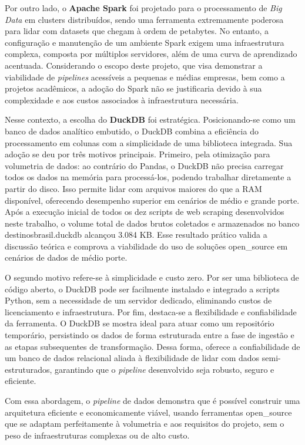 Por outro lado, o \textbf{Apache Spark} foi projetado para o processamento de \textit{Big Data} em clusters distribuídos, sendo uma ferramenta extremamente poderosa para lidar com datasets que chegam à ordem de petabytes. No entanto, a configuração e manutenção de um ambiente Spark exigem uma infraestrutura complexa, composta por múltiplos servidores, além de uma curva de aprendizado acentuada. Considerando o escopo deste projeto, que visa demonstrar a viabilidade de \textit{pipelines} acessíveis a pequenas e médias empresas, bem como a projetos acadêmicos, a adoção do Spark não se justificaria devido à sua complexidade e aos custos associados à infraestrutura necessária.

Nesse contexto, a escolha do \textbf{DuckDB} foi estratégica. Posicionando-se como um banco de dados analítico embutido, o DuckDB combina a eficiência do processamento em colunas com a simplicidade de uma biblioteca integrada. Sua adoção se deu por três motivos principais. Primeiro, pela otimização para volumetria de dados: ao contrário do Pandas, o DuckDB não precisa carregar todos os dados na memória para processá-los, podendo trabalhar diretamente a partir do disco. Isso permite lidar com arquivos maiores do que a RAM disponível, oferecendo desempenho superior em cenários de médio e grande porte. Após a execução inicial de todos os dez scripts de web scraping desenvolvidos neste trabalho, o volume total de dados brutos coletados e armazenados no banco destinosbrasil.duckdb alcançou 3.084 KB. Esse resultado prático valida a discussão teórica e comprova a viabilidade do uso de soluções \acs{open_source} em cenários de dados de médio porte.

O segundo motivo refere-se à simplicidade e custo zero. Por ser uma biblioteca de código aberto, o DuckDB pode ser facilmente instalado e integrado a scripts Python, sem a necessidade de um servidor dedicado, eliminando custos de licenciamento e infraestrutura. Por fim, destaca-se a flexibilidade e confiabilidade da ferramenta. O DuckDB se mostra ideal para atuar como um repositório temporário, persistindo os dados de forma estruturada entre a fase de ingestão e as etapas subsequentes de transformação. Dessa forma, oferece a confiabilidade de um banco de dados relacional aliada à flexibilidade de lidar com dados semi-estruturados, garantindo que o \textit{pipeline} desenvolvido seja robusto, seguro e eficiente.

Com essa abordagem, o \textit{pipeline} de dados demonstra que é possível construir uma arquitetura eficiente e economicamente viável, usando ferramentas \acs{open_source} que se adaptam perfeitamente à volumetria e aos requisitos do projeto, sem o peso de infraestruturas complexas ou de alto custo.

